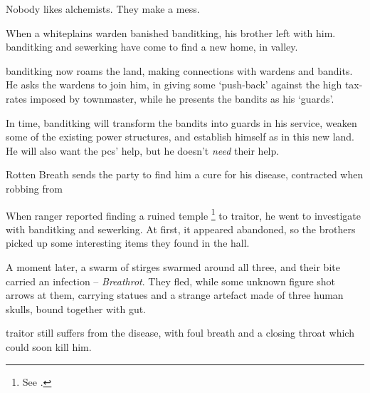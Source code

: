 \label{entitlement}


\begin{exampletext}
  \noindent
  Nobody likes alchemists.
  They make a mess.

  When a \gls{whiteplains} \gls{warden} banished \gls{banditking}, his brother left with him.
  \Gls{banditking} and \gls{sewerking} have come to find a new home, in \gls{valley}.

  \Gls{banditking} now roams the land, making connections with \glspl{warden} and bandits.
  He asks the \glspl{warden} to join him, in giving some `push-back' against the high tax-rates imposed by \gls{townmaster}, while he presents the bandits as his `guards'.
\end{exampletext}

In time, \gls{banditking} will transform the bandits into \glspl{guard} in his service, weaken some of the existing power structures, and establish himself as  in this new land.
He will also want the \glspl{pc}' help, but he doesn't \emph{need} their help.

{Rotten Breath}%
{ sends the party to find him a cure for his disease, contracted when robbing  from }%
\label{rottenBreath}

\begin{exampletext}
  When  \gls{ranger} reported finding a ruined temple%
  \footnote{See .}
  to \gls{traitor}, he went to investigate with \gls{banditking} and \gls{sewerking}.
  At first, it appeared abandoned, so the brothers picked up some interesting items they found in the hall.

  A moment later, a swarm of stirges swarmed around all three, and their bite carried an infection -- \textit{Breathrot}.%
  They fled, while some unknown figure shot arrows at them, carrying statues and a strange \gls{artefact} made of three human skulls, bound together with gut.

  \Gls{traitor} still suffers from the disease, with foul breath and a closing throat which could soon kill him.
\end{exampletext}

